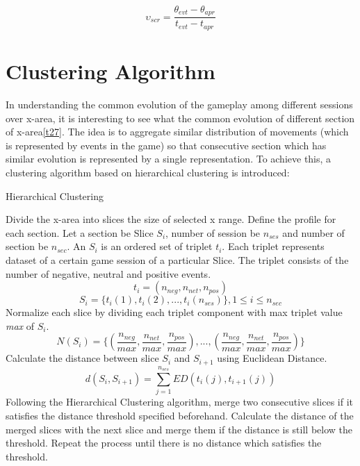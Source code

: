 $$ \upsilon_{scr} = \frac{\theta_{evt}-\theta_{apr}}{\textit{t}_{evt}-\textit{t}_{apr}} $$

\section{Clustering Algorithm}

In understanding the common evolution of the gameplay among different sessions over x-area, it is interesting to see what the common evolution of different section of x-area\ref{t27}. The idea is to aggregate similar distribution of movements (which is represented by events in the game) so that consecutive section which has similar evolution is represented by a single representation. To achieve this, a clustering algorithm based on hierarchical clustering is introduced:
\begin{algorithm}
  \caption{Hierarchical Clustering}\label{alg:Clustering}
  \begin{algorithmic}[1]
  \STATE Divide the x-area into slices the size of selected x range.
  \STATE Define the profile for each section. Let a section be Slice $\textit{S}_i$, number of session be $n_{ses}$ and number of section be $n_{sec}$. An $\textit{S}_i$ is an ordered set of triplet $\textit{t}_i$. Each triplet represents dataset of a certain game session of a particular Slice. The triplet consists of the number of negative, neutral and positive events.
$$\textit{t}_i = (n_{neg}, n_{net}, n_{pos})$$
$$\textit{S}_i = \{\textit{t}_i(1), \textit{t}_i(2), ..., \textit{t}_i(n_{ses})\}, 1\le i\le n_{sec}$$
  \STATE Normalize each slice by dividing each triplet component with max triplet value \textit{max} of $\textit{S}_i$.
$$ \textit{N}(\textit{S}_i) = \{(\frac{n_{neg}}{\textit{max}}, \frac{n_{net}}{\textit{max}}, \frac{n_{pos}}{\textit{max}}),...,(\frac{n_{neg}}{\textit{max}}, \frac{n_{net}}{\textit{max}}, \frac{n_{pos}}{\textit{max}})\}$$
  \STATE Calculate the distance between slice $\textit{S}_i$ and $\textit{S}_{i+1}$ using Euclidean Distance.
$$ d(\textit{S}_i,\textit{S}_{i+1}) = \displaystyle\sum_{j=1}^{n_{ses}} ED(\textit{t}_i (j), \textit{t}_{i+1} (j))$$
  \STATE Following the Hierarchical Clustering algorithm\cite{maimon}, merge two consecutive slices if it satisfies the distance threshold specified beforehand. Calculate the distance of the merged slices with the next slice and merge them if the distance is still below the threshold. Repeat the process until there is no distance which satisfies the threshold.


  \end{algorithmic}
\end{algorithm} 

